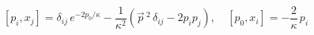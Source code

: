 \begin{equation}\label{6}
[p_i, x_j] =  \delta_{ij} \, e^{- 2p_0/\kappa}
-\frac{1}{\kappa^2}\left(\vec{p}\,{}^{ 2}\, \delta_{ij} - 2 p_{i}p_{j}\right),
\quad [p_0, x_i] = -\frac{2}\kappa\, p_i
\end{equation}

